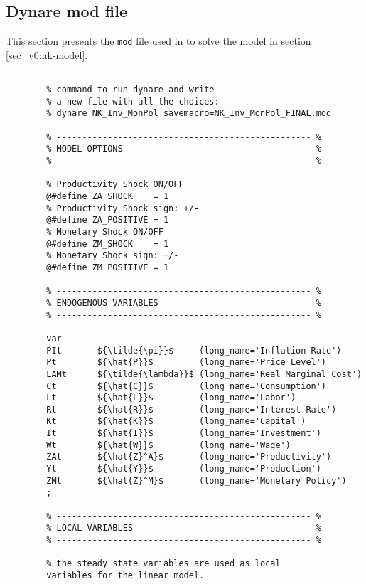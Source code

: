 \documentclass[../thesis.tex]{subfiles}
\begin{document}
\newpage

\subsection{Dynare mod file}

This section presents the \texttt{mod} file used in \dynare to solve the model in section \ref{sec_v0:nk-model}.

\vspace*{-0.5cm}

{\singlespacing
	
	\begin{verbatim} 
		
		% command to run dynare and write
		% a new file with all the choices:
		% dynare NK_Inv_MonPol savemacro=NK_Inv_MonPol_FINAL.mod
		
		% -------------------------------------------------- %
		% MODEL OPTIONS                                      %
		% -------------------------------------------------- %
		
		% Productivity Shock ON/OFF
		@#define ZA_SHOCK    = 1
		% Productivity Shock sign: +/-
		@#define ZA_POSITIVE = 1
		% Monetary Shock ON/OFF
		@#define ZM_SHOCK    = 1
		% Monetary Shock sign: +/-
		@#define ZM_POSITIVE = 1
		
		% -------------------------------------------------- %
		% ENDOGENOUS VARIABLES                               %
		% -------------------------------------------------- %
		
		var
		PIt       ${\tilde{\pi}}$     (long_name='Inflation Rate')
		Pt        ${\hat{P}}$         (long_name='Price Level')
		LAMt      ${\tilde{\lambda}}$ (long_name='Real Marginal Cost')
		Ct        ${\hat{C}}$         (long_name='Consumption')
		Lt        ${\hat{L}}$         (long_name='Labor')
		Rt        ${\hat{R}}$         (long_name='Interest Rate')
		Kt        ${\hat{K}}$         (long_name='Capital')
		It        ${\hat{I}}$         (long_name='Investment')
		Wt        ${\hat{W}}$         (long_name='Wage')
		ZAt       ${\hat{Z}^A}$       (long_name='Productivity')
		Yt        ${\hat{Y}}$         (long_name='Production')
		ZMt       ${\hat{Z}^M}$       (long_name='Monetary Policy')
		;
		
		% -------------------------------------------------- %
		% LOCAL VARIABLES                                    %
		% -------------------------------------------------- %
		
		% the steady state variables are used as local 
		variables for the linear model.
		

\end{verbatim}}
\end{document}
